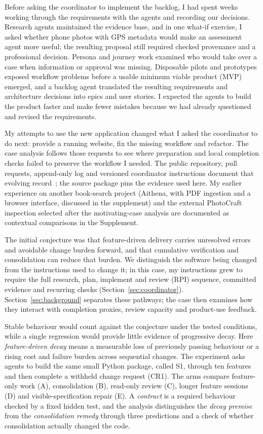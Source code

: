 \documentclass[11pt,a4paper]{article}
\begin{document}
Before asking the coordinator to implement the backlog, I had spent weeks
working through the requirements with the agents and recording our decisions.
Research agents maintained the evidence base, and in one what-if exercise, I asked whether phone photos with
GPS metadata would make an assessment agent more useful; the resulting
proposal still required checked provenance and a professional decision.
Persona and journey work examined who would take over a case when information or approval was missing.
Disposable pilots and prototypes exposed workflow problems before a usable minimum viable product (MVP)
emerged, and a backlog agent
translated the resulting requirements and architecture decisions into epics
and user stories.
I expected the agents to build the product faster and make fewer mistakes
because we had already questioned and revised the requirements.

My attempts to use the new application changed what I asked the coordinator
to do next: provide a running website, fix the missing workflow and refactor.
The case analysis follows those requests to see where preparation and local
completion checks failed to preserve the workflow I needed.
The public repository, pull requests, append-only log and versioned
coordinator instructions document that evolving record~\cite{servera2026ama};
the source package pins the evidence used here.
My earlier experience on another book-search project (Aithena, with PDF
ingestion and a browser interface, discussed in the supplement) and the
external PhotoCraft inspection selected after the motivating-case analysis
are documented as contextual comparisons in the Supplement.

The initial conjecture was that feature-driven delivery carries
unresolved errors and avoidable change burden forward, and that cumulative
verification and consolidation can reduce that burden. We distinguish
the software being changed from the instructions used to change it; in this case, my
instructions grew to require the full research, plan, implement and review
(RPI) sequence, committed evidence
and recurring checks (Section~\ref{sec:coordinator}). Section~\ref{sec:background} separates these
pathways; the case then examines how they interact with completion proxies,
review capacity and product-use feedback.

Stable behaviour would count against the conjecture under the tested conditions, while a single regression would provide little evidence of progressive decay. Here
\emph{feature-driven decay} means a measurable loss of previously passing
behaviour or a rising cost and failure burden across sequential changes.
The experiment asks agents to build the same small Python
package, called S1, through ten features and then complete a withheld
change request (CR1). The arms compare feature-only work (A), consolidation (B), read-only review (C), longer feature sessions (D) and visible-specification repair (E). A \emph{contract} is a required behaviour checked by a fixed hidden test, and the analysis distinguishes the \emph{decay premise} from
the \emph{consolidation remedy} through three predictions and a check of
whether consolidation actually changed the code.
\end{document}

